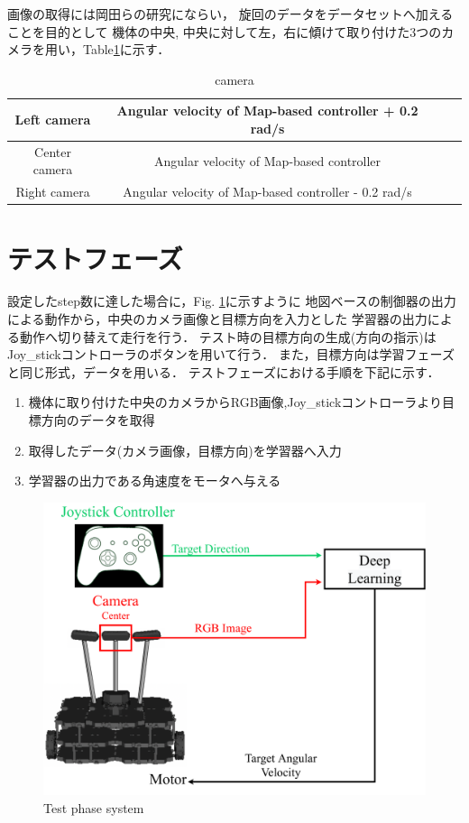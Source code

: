   画像の取得には岡田らの研究\cite{okada}にならい，
旋回のデータをデータセットへ加えることを目的として
機体の中央, 中央に対して左，右に傾けて取り付けた3つのカメラを用い，Table\ref{tb::camera_ang}に示す．
\begin{table}[H]
  \centering
  \caption{camera }
  \begin{tabular}{|c|c|ll}
  \hline
  Left camera   & Angular velocity of Map-based controller + 0.2 rad/s \\ \hline
  Center camera & Angular velocity of Map-based controller             \\ \hline
  Right camera  & Angular velocity of Map-based controller - 0.2 rad/s  \\ \hline
  \end{tabular}
  \label{tb::camera_ang}
  \end{table}

\newpage
\section{テストフェーズ}
\label{test}
設定したstep数に達した場合に，Fig. \ref{fig::testsystem}に示すように
地図ベースの制御器の出力による動作から，中央のカメラ画像と目標方向を入力とした
学習器の出力による動作へ切り替えて走行を行う．
テスト時の目標方向の生成(方向の指示)はJoy\_stickコントローラのボタンを用いて行う．
また，目標方向は学習フェーズと同じ形式，データを用いる．
テストフェーズにおける手順を下記に示す．
\begin{enumerate}
    \item 機体に取り付けた中央のカメラからRGB画像,Joy\_stickコントローラより目標方向のデータを取得
    \item 取得したデータ(カメラ画像，目標方向)を学習器へ入力
    \item 学習器の出力である角速度をモータへ与える
  \end{enumerate}


\begin{figure}[h]
    \centering
    \includegraphics[width = 12cm]{./figs/system_test.pdf}
    \caption{Test phase system}
    \label{fig::testsystem}
\end{figure}

